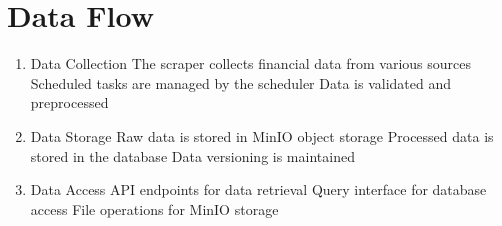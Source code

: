 \documentclass[letterpaper,10pt,english]{sphinxmanual}
\begin{document}
\begin{sphinxVerbatim}[commandchars=\\\{\}]
         
                        
\end{sphinxVerbatim}


\section{Data Flow}
\label{\detokenize{architecture:data-flow}}\begin{enumerate}
%
\item {} 
\sphinxAtStartPar
Data Collection
\sphinxhyphen{} The scraper collects financial data from various sources
\sphinxhyphen{} Scheduled tasks are managed by the scheduler
\sphinxhyphen{} Data is validated and preprocessed

\item {} 
\sphinxAtStartPar
Data Storage
\sphinxhyphen{} Raw data is stored in MinIO object storage
\sphinxhyphen{} Processed data is stored in the database
\sphinxhyphen{} Data versioning is maintained

\item {} 
\sphinxAtStartPar
Data Access
\sphinxhyphen{} API endpoints for data retrieval
\sphinxhyphen{} Query interface for database access
\sphinxhyphen{} File operations for MinIO storage

\end{enumerate}
\end{document}
